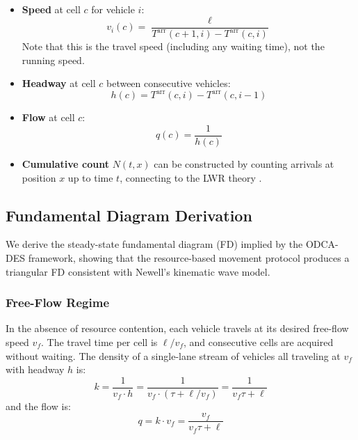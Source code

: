 \documentclass[review,authoryear]{elsarticle}
\newcommand{\Tarr}{T^{\text{arr}}}
\begin{document}
\begin{itemize}
    \item \textbf{Speed} at cell $c$ for vehicle $i$:
    \begin{equation}
        v_i(c) = \frac{\ell}{\Tarr(c+1, i) - \Tarr(c, i)}
        \label{eq:speed_from_T}
    \end{equation}
    Note that this is the travel speed (including any waiting time), not the running speed.

    \item \textbf{Headway} at cell $c$ between consecutive vehicles:
    \begin{equation}
        h(c) = \Tarr(c, i) - \Tarr(c, i-1)
        \label{eq:headway_from_T}
    \end{equation}

    \item \textbf{Flow} at cell $c$:
    \begin{equation}
        q(c) = \frac{1}{h(c)}
        \label{eq:flow_from_T}
    \end{equation}

    \item \textbf{Cumulative count} $N(t, x)$ can be constructed by counting arrivals at position $x$ up to time $t$, connecting to the LWR theory \citep{lighthill1955kinematic, richards1956shock}.
\end{itemize}

\subsection{Fundamental Diagram Derivation}
\label{sec:fd_derivation}

We derive the steady-state fundamental diagram (FD) implied by the ODCA-DES framework, showing that the resource-based movement protocol produces a triangular FD consistent with Newell's kinematic wave model.

\subsubsection{Free-Flow Regime}

In the absence of resource contention, each vehicle travels at its desired free-flow speed $v_f$. The travel time per cell is $\ell / v_f$, and consecutive cells are acquired without waiting. The density of a single-lane stream of vehicles all traveling at $v_f$ with headway $h$ is:
\begin{equation}
    k = \frac{1}{v_f \cdot h} = \frac{1}{v_f \cdot (\tau + \ell / v_f)} = \frac{1}{v_f \tau + \ell}
    \label{eq:density_freeflow}
\end{equation}
and the flow is:
\begin{equation}
    q = k \cdot v_f = \frac{v_f}{v_f \tau + \ell}
    \label{eq:flow_freeflow}
\end{equation}
\end{document}
